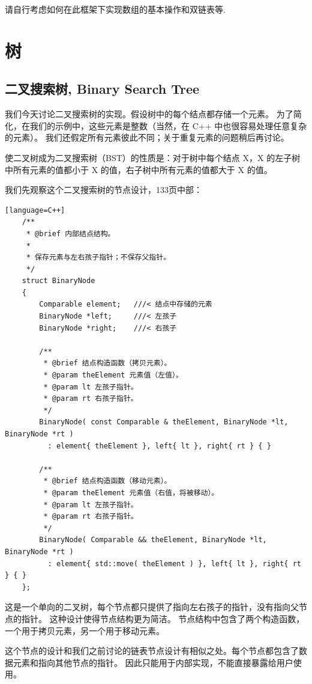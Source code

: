 \documentclass[a4paper]{ctexart}
\theoremstyle{definition}
\theoremstyle{definition}
\begin{document}
请自行考虑如何在此框架下实现数组的基本操作和双链表等. 

\section{树}

\subsection{二叉搜索树, Binary Search Tree}

我们今天讨论二叉搜索树的实现。假设树中的每个结点都存储一个元素。
为了简化，在我们的示例中，这些元素是整数（当然，在 C++ 中也很容易处理任意复杂的元素）。
我们还假定所有元素彼此不同；关于重复元素的问题稍后再讨论。

使二叉树成为二叉搜索树（BST）的性质是：对于树中每个结点 X，X 的左子树中所有元素的值都小于 X 的值，右子树中所有元素的值都大于 X 的值。

我们先观察这个二叉搜索树的节点设计，133页中部：

\begin{lstlisting}[][language=C++]
    /**
     * @brief 内部结点结构。
     *
     * 保存元素与左右孩子指针；不保存父指针。
     */
    struct BinaryNode
    {
        Comparable element;   ///< 结点中存储的元素
        BinaryNode *left;     ///< 左孩子
        BinaryNode *right;    ///< 右孩子

        /**
         * @brief 结点构造函数（拷贝元素）。
         * @param theElement 元素值（左值）。
         * @param lt 左孩子指针。
         * @param rt 右孩子指针。
         */
        BinaryNode( const Comparable & theElement, BinaryNode *lt, BinaryNode *rt )
          : element{ theElement }, left{ lt }, right{ rt } { }

        /**
         * @brief 结点构造函数（移动元素）。
         * @param theElement 元素值（右值，将被移动）。
         * @param lt 左孩子指针。
         * @param rt 右孩子指针。
         */
        BinaryNode( Comparable && theElement, BinaryNode *lt, BinaryNode *rt )
          : element{ std::move( theElement ) }, left{ lt }, right{ rt } { }
    };
\end{lstlisting}

这是一个单向的二叉树，每个节点都只提供了指向左右孩子的指针，没有指向父节点的指针。
这种设计使得节点结构更为简洁。 节点结构中包含了两个构造函数，一个用于拷贝元素，另一个用于移动元素。

这个节点的设计和我们之前讨论的链表节点设计有相似之处。每个节点都包含了数据元素和指向其他节点的指针。
因此只能用于内部实现，不能直接暴露给用户使用。
\end{document}
